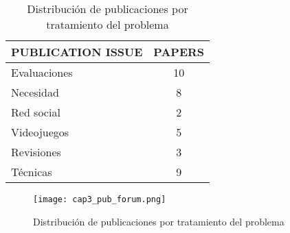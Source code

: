 \begin{table}[H]
  \begin{center}
  \begin{tabular}{| m{4cm} | c |}
    \hline
    PUBLICATION ISSUE & PAPERS\\
    \hline
    \hline 
    Evaluaciones & 10\\
    \hline
    Necesidad & 8\\
    \hline
    Red social & 2\\
    \hline
    Videojuegos & 5\\
    \hline
    Revisiones & 3\\
    \hline
    Técnicas & 9 \\
    \hline
  \end{tabular}
\end{center}
\caption{Distribución de publicaciones por tratamiento del problema}
\label{tab:PublicacionesForum}
\end{table} 

\begin{figure}[H]
  \begin{center}
    \texttt{[image: cap3\_pub\_forum.png]}
  \end{center}
  \caption{Distribución de publicaciones por tratamiento del problema}
  \label{fig:PublicacionesForum}
\end{figure}
